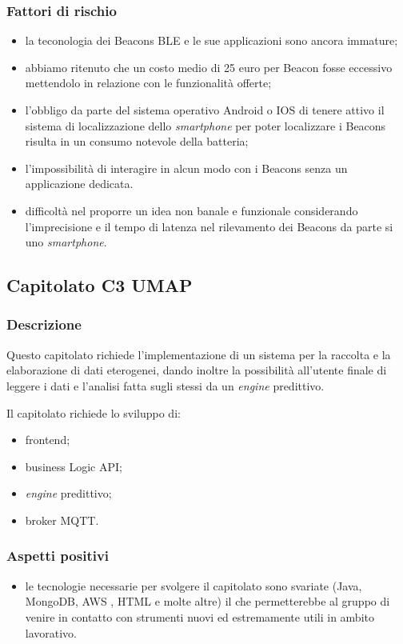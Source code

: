 \documentclass[12pt,a4paper]{article}
\begin{document}
\subsubsection{Fattori di rischio}
\begin{itemize}
\item la teconologia dei Beacons BLE e le sue applicazioni sono ancora immature;
\item abbiamo ritenuto che un costo medio di 25 euro per Beacon fosse eccessivo mettendolo in relazione con le funzionalità offerte;
\item l'obbligo da parte del sistema operativo Android o IOS di tenere attivo il sistema di localizzazione dello \textit{smartphone} per poter localizzare i Beacons risulta in un consumo notevole della batteria;
\item l'impossibilità di interagire in alcun modo con i Beacons senza un applicazione dedicata.
\item difficoltà nel proporre un idea non banale e funzionale considerando l'imprecisione e il tempo di latenza nel rilevamento dei Beacons da parte si uno \textit{smartphone}.
\end{itemize}

\newpage
\subsection{Capitolato C3 UMAP}

\subsubsection{Descrizione}

Questo capitolato richiede l'implementazione di un sistema per la  raccolta e la elaborazione di dati eterogenei, dando inoltre la possibilità all'utente finale di leggere i dati e l'analisi fatta sugli stessi da un \textit{engine} predittivo.

Il capitolato richiede lo sviluppo di:
\begin{itemize}
\item frontend;
\item business Logic API; 
\item \textit{engine} predittivo;
\item broker MQTT. 
\end{itemize}

\subsubsection{Aspetti positivi}
\begin{itemize}
\item le tecnologie necessarie per svolgere il capitolato sono svariate (Java, MongoDB, AWS , HTML e molte altre) il che permetterebbe al gruppo di venire in contatto con strumenti nuovi ed estremamente utili in ambito lavorativo.
\end{itemize}
\end{document}
